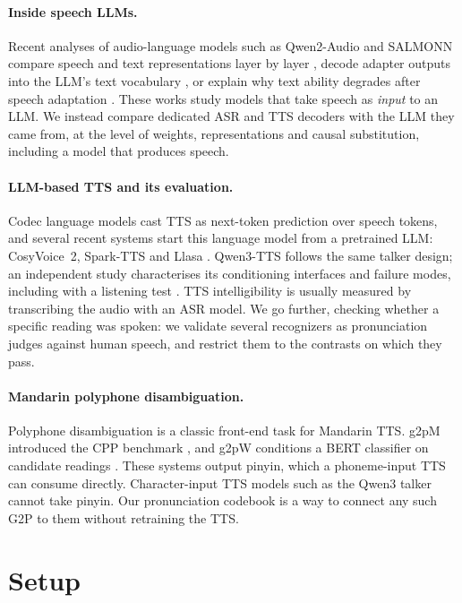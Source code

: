 \documentclass[11pt]{article}
\begin{document}
\paragraph{Inside speech LLMs.} Recent analyses of audio-language models such as Qwen2-Audio and SALMONN compare speech and text representations layer by layer \citep{xiang2025modalitygap}, decode adapter outputs into the LLM's text vocabulary \citep{ogunremi2025transcribe}, or explain why text ability degrades after speech adaptation \citep{wang2025textdegradation}. These works study models that take speech as \emph{input} to an LLM. We instead compare dedicated ASR and TTS decoders with the LLM they came from, at the level of weights, representations and causal substitution, including a model that produces speech.

\paragraph{LLM-based TTS and its evaluation.} Codec language models \citep{valle} cast TTS as next-token prediction over speech tokens, and several recent systems start this language model from a pretrained LLM: CosyVoice~2, Spark-TTS and Llasa \citep{cosyvoice2,sparktts,llasa}. Qwen3-TTS \citep{qwen3tts} follows the same talker design; an independent study characterises its conditioning interfaces and failure modes, including with a listening test \citep{baroudi2026qwen3tts}. TTS intelligibility is usually measured by transcribing the audio with an ASR model. We go further, checking whether a specific reading was spoken: we validate several recognizers \citep{sensevoice,paraformer,whisper} as pronunciation judges against human speech, and restrict them to the contrasts on which they pass.

\paragraph{Mandarin polyphone disambiguation.} Polyphone disambiguation is a classic front-end task for Mandarin TTS. g2pM introduced the CPP benchmark \citep{g2pm}, and g2pW conditions a BERT classifier on candidate readings \citep{g2pw}. These systems output pinyin, which a phoneme-input TTS can consume directly. Character-input TTS models such as the Qwen3 talker cannot take pinyin. Our pronunciation codebook is a way to connect any such G2P to them without retraining the TTS.

\section{Setup}
\label{sec:setup}
\end{document}
